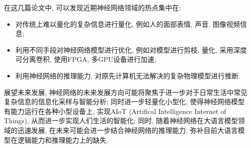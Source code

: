 \documentclass[]{ctexart}
\begin{document}
	在这几篇论文中, 可以发现近期神经网络领域的热点集中在: 
	
\begin{itemize}
	\item 对传统上难以量化的复杂信息进行量化, 例如人的面部表情, 声音, 图像视频信息;
	\item 利用不同手段对神经网络模型进行优化, 例如对模型进行剪枝, 量化, 采用深度可分离卷积, 使用FPGA, 多GPU设备进行加速;
	\item 利用神经网络的推理能力, 对原先计算机无法解决的复杂物理模型进行推断.
	
\end{itemize}

	展望未来发展, 神经网络的未来发展方向可能将聚焦于进一步对于日常生活中常见复杂信息的信息化采样与智能分析; 同时进一步轻量化小型化, 使得神经网络模型有能力运行在各种小型设备上, 实现AIoT (Artifical Intelligence Internet of Things), 从而进一步实现人们生活的智能化; 同时, 随着神经网络在大语言模型领域的迅速发展, 在未来可能会进一步结合神经网络的推理能力, 弥补目前大语言模型在逻辑能力和推理能力上的缺失. 
	

\end{document}

